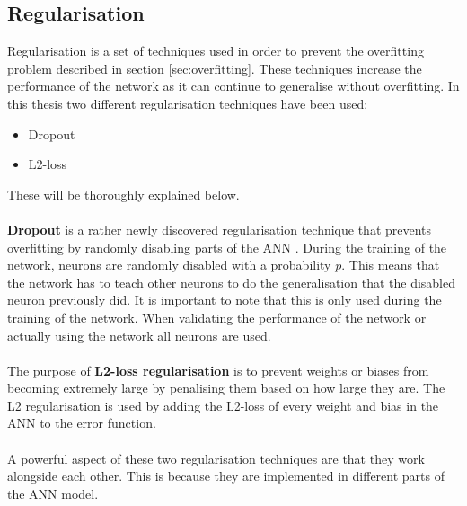 \subsection{Regularisation}\label{sec:regularisation}
Regularisation is a set of techniques used in order to prevent the overfitting problem described in section \ref{sec:overfitting}. These techniques increase the performance of the network as it can continue to generalise without overfitting. 
In this thesis two different regularisation techniques have been used:
\begin{itemize}
    \item Dropout
    \item L2-loss
\end{itemize}
These will be thoroughly explained below.
\\\\
\textbf{Dropout} is a rather newly discovered regularisation technique that prevents overfitting by randomly disabling parts of the ANN \parencite{srivastava2014dropout}. During the training of the network, neurons are randomly disabled with a probability $p$. This means that the network has to teach other neurons to do the generalisation that the disabled neuron previously did. It is important to note that this is only used during the training of the network. When validating the performance of the network or actually using the network all neurons are used.
\\\\
The purpose of \textbf{L2-loss regularisation} is to prevent weights or biases from becoming extremely large by penalising them based on how large they are. The L2 regularisation is used by adding the L2-loss of every weight and bias in the ANN to the error function.
\\\\

A powerful aspect of these two regularisation techniques are that they work alongside each other. This is because they are implemented in different parts of the ANN model.

